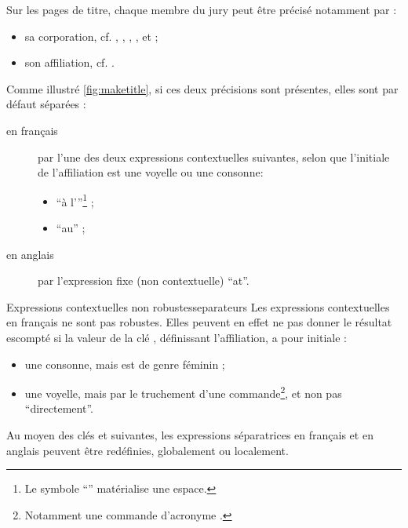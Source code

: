 Sur les pages de titre, chaque membre du jury peut être précisé notamment par :
\begin{itemize}
\item sa corporation, cf. , , ,
  ,  et
   ;
\item son affiliation, cf. .
\end{itemize}
Comme illustré \vref{fig:maketitle}, si ces deux précisions sont présentes,
elles sont par défaut séparées :
\begin{description}
\item[en français] par l'une des deux expressions contextuelles suivantes,
  selon que l'initiale de l'affiliation est une voyelle ou une consonne:
  \begin{itemize}
  \item \enquote{\textvisiblespace{}à l'}\footnote{Le symbole
      \enquote{\textvisiblespace{}} matérialise une espace.} ;
  \item \enquote{\textvisiblespace{}au\textvisiblespace{}} ;
  \end{itemize}
\item[en anglais] par l'expression fixe (non contextuelle)
  \enquote{\textvisiblespace{}at\textvisiblespace{}}.
\end{description}

\begin{dbwarning}{Expressions contextuelles non robustes}{separateurs}
  Les expressions contextuelles en français ne sont pas robustes. Elles peuvent
  en effet ne pas donner le résultat escompté si la valeur de la clé
  , définissant l'affiliation, a pour initiale :
  \begin{itemize}
  \item une consonne, mais est de genre féminin ;
  \item une voyelle, mais par le truchement d'une commande\footnote{Notamment
      une commande d'acronyme .}, et non pas \enquote{directement}.
  \end{itemize}
\end{dbwarning}

Au moyen des clés  et 
suivantes, les expressions séparatrices en français et en anglais peuvent être
redéfinies, globalement ou localement.

